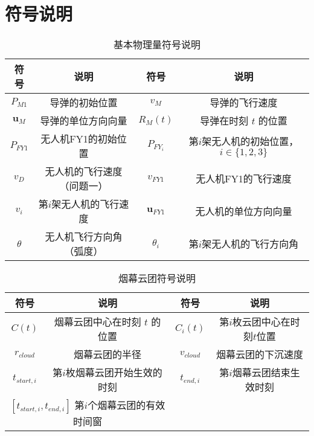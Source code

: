 \section{符号说明}

\begin{table}[htbp]
\centering
\caption{基本物理量符号说明}
\label{tab:symbols_basic}
\begin{tabular}{cccc}
\toprule
\textbf{符号} & \textbf{说明} & \textbf{符号} & \textbf{说明} \\
\midrule
$P_{M1}$ & 导弹的初始位置 & $v_M$ & 导弹的飞行速度 \\
$\mathbf{u}_M$ & 导弹的单位方向向量 & $R_M(t)$ & 导弹在时刻 $t$ 的位置 \\
$P_{FY1}$ & 无人机FY1的初始位置 & $P_{FY_i}$ & 第$i$架无人机的初始位置，$i \in \{1,2,3\}$ \\
$v_D$ & 无人机的飞行速度（问题一） & $v_{FY1}$ & 无人机FY1的飞行速度 \\
$v_i$ & 第$i$架无人机的飞行速度 & $\mathbf{u}_{FY1}$ & 无人机的单位方向向量 \\
$\theta$ & 无人机飞行方向角（弧度） & $\theta_i$ & 第$i$架无人机的飞行方向角 \\
\bottomrule
\end{tabular}
\end{table}

\begin{table}[htbp]
\centering
\caption{烟幕云团符号说明}
\label{tab:symbols_cloud}
\begin{tabular}{cccc}
\toprule
\textbf{符号} & \textbf{说明} & \textbf{符号} & \textbf{说明} \\
\midrule
$C(t)$ & 烟幕云团中心在时刻 $t$ 的位置 & $C_i(t)$ & 第$i$枚云团中心在时刻$t$位置 \\
$r_{cloud}$ & 烟幕云团的半径 & $v_{cloud}$ & 烟幕云团的下沉速度 \\
$t_{start,i}$ & 第$i$枚烟幕云团开始生效的时刻 & $t_{end,i}$ & 第$i$烟幕云团结束生效时刻 \\
\multicolumn{2}{c}{$[t_{start,i}, t_{end,i}]$ 第$i$个烟幕云团的有效时间窗} & & \\
\bottomrule
\end{tabular}
\end{table}

